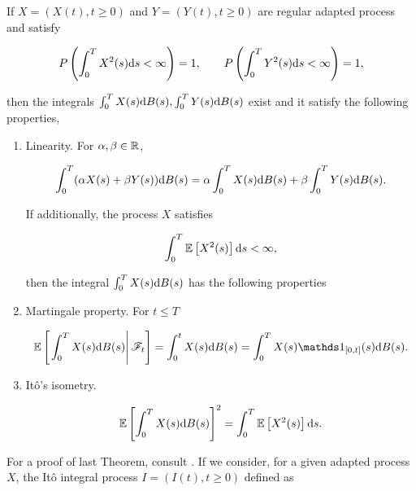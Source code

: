 \begin{theorem}
    If $X = (X(t), t \ge 0)$ and $Y = (Y(t), t \ge 0)$ are regular adapted process and satisfy

    \begin{equation*}
        P\left(  \int_0^T X^2(s) \mathrm d s < \infty  \right) = 1, \qquad P\left(  \int_0^T Y^2(s) \mathrm d s < \infty  \right) = 1,
    \end{equation*}

    \noindent then the integrals $\int_0^T X(s) \mathrm d B(s), \int_0^T Y(s) \mathrm d B(s)$ exist and it satisfy the following properties,

    \begin{enumerate}
        \item Linearity. For $\alpha,\beta \in \mathbb R$,

        \begin{equation}
            \int_0^T (\alpha X(s) + \beta Y(s))\mathrm d B(s) = \alpha \int_0^T X(s)\mathrm d B(s) + \beta \int_0^T Y(s) \mathrm d B(s).
        \end{equation}
    
    If additionally, the process $X$ satisfies 

    \begin{equation*}
        \int_0^T \mathbb E \left[ X^2(s) \right] \mathrm d s < \infty,
    \end{equation*}

    then the integral $\int_0^T X(s) \mathrm d B(s)$ has the following properties

    \item Martingale property. For $t \le T$
    
    \begin{equation*}
        \E{ \left. \int_0^T X(s) \d B(s) \right| \F_t  } = \int_0^t X(s) \d B(s) = \int_0^T X(s)\mathds 1_{[0,t]}(s) \d B(s).
    \end{equation*}

    \item Itô's isometry. 
    
    \begin{equation*}
        \mathbb E \left[  \int_0^T X(s) \mathrm d B(s)  \right]^2 = \int_0^T \mathbb E \left[ X^2(s) \right] \mathrm d s.
    \end{equation*}
    
    \end{enumerate}
\end{theorem}

For a proof of last Theorem, consult \cite{book:klebaner}. If we consider, for a given adapted process $X$, the Itô integral process $I=(I(t), t \ge 0)$ defined as

